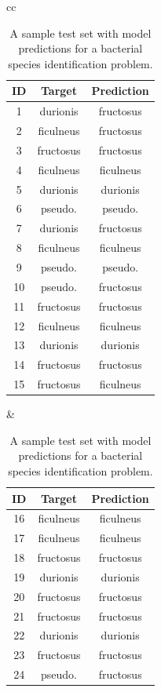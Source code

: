 \documentclass[xcolor={table}]{beamer}
\newcommand{\featN}[1]{\textsc{#1}}
\begin{document}
 \begin{frame} 
\begin{table}[htb]
	\caption{A sample test set with model predictions for a bacterial species identification problem.}
\label{tab:multinomialPredictionExample}
\centering
\begin{scriptsize}
\begin{tabular}{cc}
		\hline
			\begin{minipage}{0.36\textwidth}
					\begin{tabular}{ c c c }
\featN{ID}	 & Target	& Prediction \\
\hline
1	&	durionis	&	fructosus	\\
2	&	ficulneus	&	fructosus	\\
3	&	fructosus	&	fructosus	\\
4	&	ficulneus	&	ficulneus	\\
5	&	durionis	&	durionis	\\
6	&	pseudo.	&	pseudo.	\\
7	&	durionis	&	fructosus	\\
8	&	ficulneus	&	ficulneus	\\
9	&	pseudo.	&	pseudo.	\\
10	&	pseudo.	&	fructosus	\\
11	&	fructosus	&	fructosus	\\
12	&	ficulneus	&	ficulneus	\\
13	&	durionis	&	durionis	\\
14	&	fructosus	&	fructosus	\\
15	&	fructosus	&	ficulneus	\\
\hline 
\end{tabular}
			\end{minipage}
			&
			\begin{minipage}{0.36\textwidth}
										\begin{tabular}{ c c c }
\featN{ID}	 & Target	& Prediction \\
\hline
16	&	ficulneus	&	ficulneus	\\
17	&	ficulneus	&	ficulneus	\\
18	&	fructosus	&	fructosus	\\
19	&	durionis	&	durionis	\\
20	&	fructosus	&	fructosus	\\
21	&	fructosus	&	fructosus	\\
22	&	durionis	&	durionis	\\
23	&	fructosus	&	fructosus	\\
24	&	pseudo.	&	fructosus	\\

\end{tabular}
\end{minipage}
\end{tabular}
\end{scriptsize}
\end{table}
\end{frame}
\end{document}
